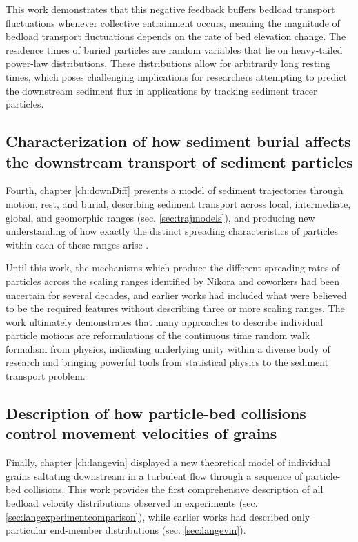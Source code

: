 This work demonstrates that this negative feedback buffers bedload transport fluctuations whenever collective entrainment occurs, meaning the magnitude of bedload transport fluctuations depends on the rate of bed elevation change. The residence times of buried particles are random variables that lie on heavy-tailed power-law distributions. These distributions allow for arbitrarily long resting times, which poses challenging implications for researchers attempting to predict the downstream sediment flux in applications by tracking sediment tracer particles. 

\subsection{Characterization of how sediment burial affects the downstream transport of sediment particles}

Fourth, chapter \ref{ch:downDiff} presents a model of sediment trajectories through motion, rest, and burial, describing sediment transport across local, intermediate, global, and geomorphic ranges (sec. \ref{sec:trajmodels}), and producing new understanding of how exactly the distinct spreading characteristics of particles within each of these ranges arise \citep[e.g][]{Pretzlav2021}.

Until this work, the mechanisms which produce the different spreading rates of particles across the scaling ranges identified by Nikora and coworkers had been uncertain for several decades, and earlier works had included what were believed to be the required features without describing three or more scaling ranges. 
The work ultimately demonstrates that many approaches to describe individual particle motions are reformulations of the continuous time random walk formalism from physics, indicating underlying unity within a diverse body of research and bringing powerful tools from statistical physics to the sediment transport problem.

\subsection{Description of how particle-bed collisions control movement velocities of grains}

Finally, chapter \ref{ch:langevin} displayed a new theoretical model of individual grains saltating downstream in a turbulent flow through a sequence of particle-bed collisions.
This work provides the first comprehensive description of all bedload velocity distributions observed in experiments (sec. \ref{sec:langexperimentcomparison}), while earlier works had described only particular end-member distributions (sec. \ref{sec:langevin}).

